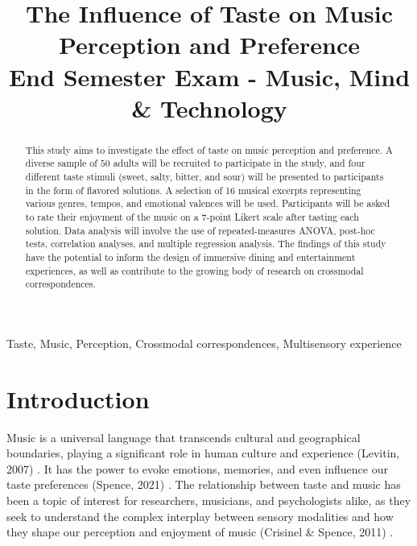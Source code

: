 \documentclass[conference]{IEEEtran}
\begin{document}
\title{The Influence of Taste on Music Perception and Preference\\
{\large End Semester Exam - Music, Mind \& Technology}
}

\author{
}

\maketitle

\begin{abstract}
This study aims to investigate the effect of taste on music perception and preference. A diverse sample of $50$ adults will be recruited to participate in the study, and four different taste stimuli (sweet, salty, bitter, and sour) will be presented to participants in the form of flavored solutions. A selection of 16 musical excerpts representing various genres, tempos, and emotional valences will be used. Participants will be asked to rate their enjoyment of the music on a 7-point Likert scale after tasting each solution. Data analysis will involve the use of repeated-measures ANOVA, post-hoc tests, correlation analyses, and multiple regression analysis. The findings of this study have the potential to inform the design of immersive dining and entertainment experiences, as well as contribute to the growing body of research on crossmodal correspondences.
\end{abstract}

\begin{IEEEkeywords}
Taste, Music, Perception, Crossmodal correspondences, Multisensory experience
\end{IEEEkeywords}

\section{Introduction}

Music is a universal language that transcends cultural and geographical boundaries, playing a significant role in human culture and experience (Levitin, 2007) \cite{b1}. It has the power to evoke emotions, memories, and even influence our taste preferences (Spence, 2021) \cite{b2}. The relationship between taste and music has been a topic of interest for researchers, musicians, and psychologists alike, as they seek to understand the complex interplay between sensory modalities and how they shape our perception and enjoyment of music (Crisinel \& Spence, 2011) \cite{b3}.
\end{document}
